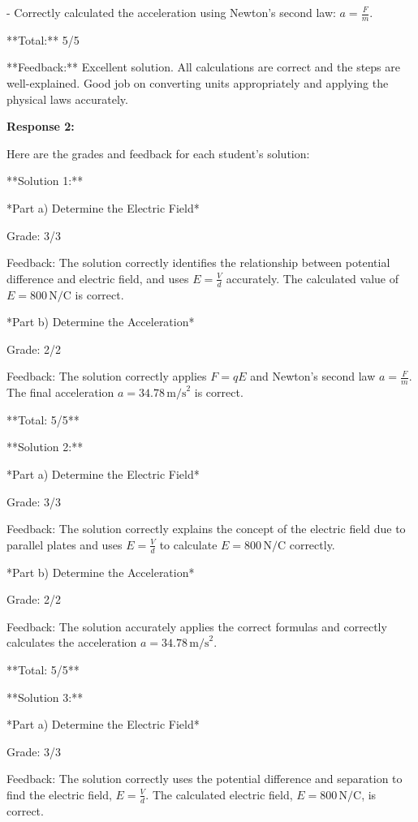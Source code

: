 \documentclass[a4paper,11pt]{article}
\begin{document}
  - Correctly calculated the acceleration using Newton's second law: \( a = \frac{F}{m} \).

**Total:** 5/5

**Feedback:** Excellent solution. All calculations are correct and the steps are well-explained. Good job on converting units appropriately and applying the physical laws accurately.

\bigskip
\textbf{Response 2:}

Here are the grades and feedback for each student's solution:

**Solution 1:**

*Part a) Determine the Electric Field*

Grade: 3/3

Feedback: The solution correctly identifies the relationship between potential difference and electric field, and uses \( E = \frac{V}{d} \) accurately. The calculated value of \( E = 800 \, \text{N/C} \) is correct.

*Part b) Determine the Acceleration*

Grade: 2/2

Feedback: The solution correctly applies \( F = qE \) and Newton's second law \( a = \frac{F}{m} \). The final acceleration \( a = 34.78 \, \text{m/s}^2 \) is correct.

**Total: 5/5**

**Solution 2:**

*Part a) Determine the Electric Field*

Grade: 3/3

Feedback: The solution correctly explains the concept of the electric field due to parallel plates and uses \( E = \frac{V}{d} \) to calculate \( E = 800 \, \text{N/C} \) correctly.

*Part b) Determine the Acceleration*

Grade: 2/2

Feedback: The solution accurately applies the correct formulas and correctly calculates the acceleration \( a = 34.78 \, \text{m/s}^2 \).

**Total: 5/5**

**Solution 3:**

*Part a) Determine the Electric Field*

Grade: 3/3

Feedback: The solution correctly uses the potential difference and separation to find the electric field, \( E = \frac{V}{d} \). The calculated electric field, \( E = 800 \, \text{N/C} \), is correct.
\end{document}
